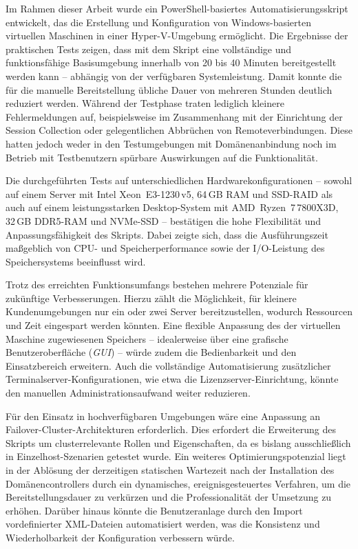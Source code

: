 \documentclass[conference]{IEEEtran}
\begin{document}
Im Rahmen dieser Arbeit wurde ein PowerShell-basiertes Automatisierungsskript entwickelt, das die Erstellung und Konfiguration von Windows-basierten virtuellen Maschinen in einer Hyper-V-Umgebung ermöglicht.  
Die Ergebnisse der praktischen Tests zeigen, dass mit dem Skript eine vollständige und funktionsfähige Basisumgebung innerhalb von 20 bis 40 Minuten bereitgestellt werden kann – abhängig von der verfügbaren Systemleistung.  
Damit konnte die für die manuelle Bereitstellung übliche Dauer von mehreren Stunden deutlich reduziert werden.  
Während der Testphase traten lediglich kleinere Fehlermeldungen auf, beispielsweise im Zusammenhang mit der Einrichtung der Session Collection oder gelegentlichen Abbrüchen von Remoteverbindungen.  
Diese hatten jedoch weder in den Testumgebungen mit Domänenanbindung noch im Betrieb mit Testbenutzern spürbare Auswirkungen auf die Funktionalität.

Die durchgeführten Tests auf unterschiedlichen Hardwarekonfigurationen – sowohl auf einem Server mit Intel Xeon~E3-1230\,v5, 64\,GB RAM und SSD-RAID als auch auf einem leistungsstarken Desktop-System mit AMD~Ryzen~7\,7800X3D, 32\,GB DDR5-RAM und NVMe-SSD – bestätigen die hohe Flexibilität und Anpassungsfähigkeit des Skripts.  
Dabei zeigte sich, dass die Ausführungszeit maßgeblich von CPU- und Speicherperformance sowie der I/O-Leistung des Speichersystems beeinflusst wird.

Trotz des erreichten Funktionsumfangs bestehen mehrere Potenziale für zukünftige Verbesserungen.  
Hierzu zählt die Möglichkeit, für kleinere Kundenumgebungen nur ein oder zwei Server bereitzustellen, wodurch Ressourcen und Zeit eingespart werden könnten.  
Eine flexible Anpassung des der virtuellen Maschine zugewiesenen Speichers – idealerweise über eine grafische Benutzeroberfläche (\textit{GUI}) – würde zudem die Bedienbarkeit und den Einsatzbereich erweitern.  
Auch die vollständige Automatisierung zusätzlicher Terminalserver-Konfigurationen, wie etwa die Lizenzserver-Einrichtung, könnte den manuellen Administrationsaufwand weiter reduzieren.  

Für den Einsatz in hochverfügbaren Umgebungen wäre eine Anpassung an Failover-Cluster-Architekturen erforderlich.  
Dies erfordert die Erweiterung des Skripts um clusterrelevante Rollen und Eigenschaften, da es bislang ausschließlich in Einzelhost-Szenarien getestet wurde.  
Ein weiteres Optimierungspotenzial liegt in der Ablösung der derzeitigen statischen Wartezeit nach der Installation des Domänencontrollers durch ein dynamisches, ereignisgesteuertes Verfahren, um die Bereitstellungsdauer zu verkürzen und die Professionalität der Umsetzung zu erhöhen.  
Darüber hinaus könnte die Benutzeranlage durch den Import vordefinierter XML-Dateien automatisiert werden, was die Konsistenz und Wiederholbarkeit der Konfiguration verbessern würde.
\end{document}

